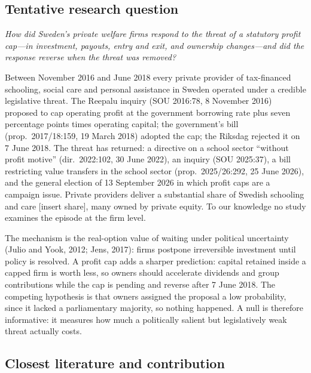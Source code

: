 \documentclass[12pt,a4paper]{article}
\begin{document}
\subsection{Tentative research question}

\emph{How did Sweden's private welfare firms respond to the threat of a statutory profit cap---in investment, payouts, entry and exit, and ownership changes---and did the response reverse when the threat was removed?}

Between November 2016 and June 2018 every private provider of tax-financed schooling, social care and personal assistance in Sweden operated under a credible legislative threat. The Reepalu inquiry (SOU 2016:78, 8 November 2016) proposed to cap operating profit at the government borrowing rate plus seven percentage points times operating capital; the government's bill (prop.\ 2017/18:159, 19 March 2018) adopted the cap; the Riksdag rejected it on 7 June 2018. The threat has returned: a directive on a school sector ``without profit motive'' (dir.\ 2022:102, 30 June 2022), an inquiry (SOU 2025:37), a bill restricting value transfers in the school sector (prop.\ 2025/26:292, 25 June 2026), and the general election of 13 September 2026 in which profit caps are a campaign issue. Private providers deliver a substantial share of Swedish schooling and care [insert share], many owned by private equity. To our knowledge no study examines the episode at the firm level.

The mechanism is the real-option value of waiting under political uncertainty (Julio and Yook, 2012; Jens, 2017): firms postpone irreversible investment until policy is resolved. A profit cap adds a sharper prediction: capital retained inside a capped firm is worth less, so owners should accelerate dividends and group contributions while the cap is pending and reverse after 7 June 2018. The competing hypothesis is that owners assigned the proposal a low probability, since it lacked a parliamentary majority, so nothing happened. A null is therefore informative: it measures how much a politically salient but legislatively weak threat actually costs.

\subsection{Closest literature and contribution}
\end{document}
